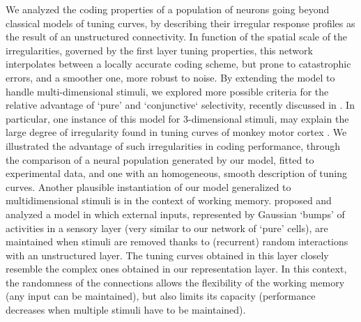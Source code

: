 \documentclass[a4paper]{article}%
\begin{document}
We analyzed the coding properties of a population of neurons going beyond
classical models of tuning curves, by describing their irregular response
profiles as the result of an unstructured connectivity. In function of the
spatial scale of the irregularities, governed by the first layer tuning
properties, this network interpolates between a locally accurate coding
scheme, but prone to catastrophic errors, and a smoother one, more robust to
noise. By extending the model to handle multi-dimensional stimuli, we explored
more possible criteria for the relative advantage of `pure' and `conjunctive`
selectivity, recently discussed in
\cite[]{Finkelstein2018OptimalBats,Harel2020OptimalConstraints}.
In particular, one instance of this model for 3-dimensional stimuli, may
explain the large degree of irregularity found in tuning curves of monkey
motor cortex \cite[]{Lalazar2016TuningConnectivity}. We illustrated the
advantage of such irregularities in coding performance, through the comparison
of a neural population generated by our model, fitted to experimental data,
and one with an homogeneous, smooth description of tuning curves.
Another plausible instantiation of our model generalized to multidimensional stimuli is in the context of working
memory. \cite{Bouchacourt2019AMemory} proposed and analyzed a model in which
external inputs, represented by Gaussian `bumps' of activities in a sensory
layer (very similar to our network of `pure' cells), are maintained when
stimuli are removed thanks to (recurrent) random interactions with an
unstructured layer. The tuning curves obtained in this layer closely resemble
the complex ones obtained in our representation layer. In this context, the randomness of the
connections allows the flexibility of the working memory (any input can be
maintained), but also limits its capacity (performance decreases when multiple
stimuli have to be maintained).
\end{document}
